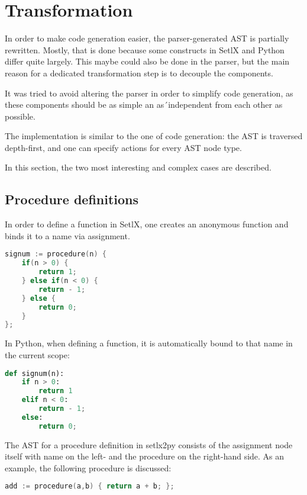 
\section{Transformation}

\label{sec:transformer}

In order to make code generation easier, the parser-generated AST is partially rewritten.  Mostly, that is done because some constructs in SetlX and Python differ quite largely. This maybe could also be done in the parser, but the main reason for a dedicated transformation step is to decouple the components. 

It was tried to avoid altering the parser in order to simplify code generation, as these components should be as simple an as´independent from each other as possible. 

The implementation is similar to the one of code generation: the AST is traversed depth-first, and one can specify actions for every AST node type. 

In this section, the two most interesting and complex cases are described.

%
\subsection{Procedure definitions}

In order to define a function in SetlX, one creates an anonymous function and binds it to a name via assignment.

\begin{lstlisting}[language=c]
signum := procedure(n) {
    if(n > 0) {
        return 1;
    } else if(n < 0) {
        return - 1;
    } else {
        return 0;
    }
};
\end{lstlisting}

In Python, when defining a function, it is automatically bound to that name in the current scope:

\begin{lstlisting}[language=python]
def signum(n):
    if n > 0:
        return 1
    elif n < 0:
        return - 1;
    else:
        return 0;
\end{lstlisting}

The AST for a procedure definition in setlx2py consists of the assignment node itself with name on the left- and the procedure on the right-hand side. As an example, the following procedure is discussed:

\begin{lstlisting}[language=c]
add := procedure(a,b) { return a + b; };
\end{lstlisting}

